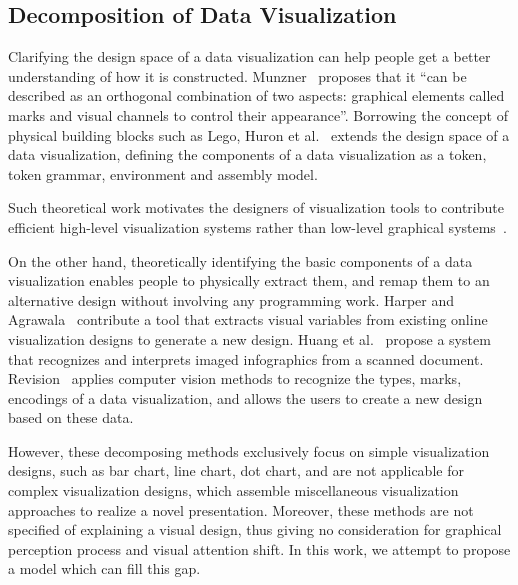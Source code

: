\subsection{Decomposition of Data Visualization}
Clarifying the design space of a data visualization can help people get a better understanding of how it is constructed. Munzner~\cite{munzner_visualization_2014} proposes that it ``can be described as an orthogonal combination of two aspects: graphical elements called marks and visual channels to control their appearance''. Borrowing the concept of physical building blocks such as Lego, Huron et al.~\cite{huron_constructive_2014} extends the design space of a data visualization, defining the components of a data visualization as a token, token grammar, environment and assembly model.

Such theoretical work motivates the designers of visualization tools to contribute efficient high-level visualization systems rather than low-level graphical systems~\cite{bostock_protovis:_2009,mendez_ivolver:_2016}. 

On the other hand, theoretically identifying the basic components of a data visualization enables people to physically extract them, and remap them to an alternative design without involving any programming work. Harper and Agrawala~\cite{harper_deconstructing_2014} contribute a tool that extracts visual variables from existing online visualization designs to generate a new design. Huang et al.~\cite{Huang:2007:SUI:1284420.1284427} propose a system that recognizes and interprets imaged
infographics from a scanned document. Revision~\cite{savva_revision:_2011} applies computer vision methods to recognize the types, marks, encodings of a data visualization, and allows the users to create a new design based on these data. 

However, these decomposing methods exclusively focus on simple visualization designs, such as bar chart, line chart, dot chart, and are not applicable for complex visualization designs, which assemble miscellaneous visualization approaches to realize a novel presentation. Moreover, these methods are not specified of explaining a visual design, thus giving no consideration for graphical perception process and visual attention shift. In this work, we attempt to propose a model which can fill this gap.

